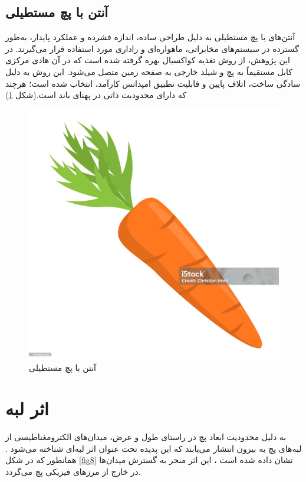 \subsection{آنتن با پچ مستطیلی}
آنتن‌های با پچ مستطیلی به دلیل طراحی ساده، اندازه فشرده و عملکرد پایدار، به‌طور گسترده در سیستم‌های مخابراتی، ماهواره‌ای و راداری مورد استفاده قرار می‌گیرند. در این پژوهش، از روش تغذیه کواکسیال بهره گرفته شده است که در آن هادی مرکزی کابل مستقیماً به پچ و شیلد خارجی به صفحه زمین متصل می‌شود. این روش به دلیل سادگی ساخت، اتلاف پایین و قابلیت تطبیق امپدانس کارآمد، انتخاب شده است؛ هرچند که دارای محدودیت ذاتی در پهنای باند است.(شکل 
\ref{fig7})
\begin{figure}
	\centering
	\includegraphics[scale=0.3]{Images/aaa.jpg}
	\caption{آنتن با پچ مستطیلی}
	\label{fig7}
\end{figure}


\section{اثر لبه}

به دلیل محدودیت ابعاد پچ در راستای طول و عرض، میدان‌های الکترومغناطیسی از لبه‌های پچ به بیرون انتشار می‌یابند که این پدیده تحت عنوان اثر لبه‌ای
شناخته می‌شود
\cite{chahar}.
همانطور که در شکل 
\ref{fig8}
نشان داده شده است
\cite{do}،
این اثر منجر به گسترش میدان‌ها در خارج از مرزهای فیزیکی پچ می‌گردد.

